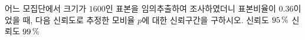 어느 모집단에서 크기가 $1600$인 표본을 임의추출하여 조사하였더니 표본비율이 $0.36$이었을 때, 다음 신뢰도로 추정한 모비율 $p$에 대한 신뢰구간을 구하시오. 
 신뢰도 $95\mkern3mu \%$
 신뢰도 $99\mkern3mu \%$
